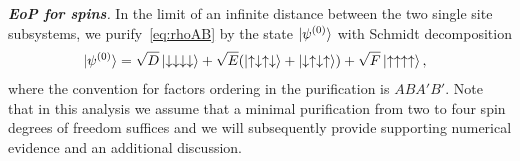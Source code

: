 \documentclass[prl,a4paper,notitlepage,twocolumn,superscriptaddress,longbibliography,reprint]{revtex4-2}
\newcommand{\mysection}[1]{{\vspace{10 pt}\noindent \emph{{\textbf{#1}}.}}}
\begin{document}
\mysection{EoP for spins} In the limit of an infinite distance between the two single site subsystems, we purify~\eqref{eq:rhoAB} by the state $\ket{\psi^{(0)}}$ with Schmidt decomposition
\begin{align}
\hspace{-7 pt}    \ket{\psi^{(0)}}=\sqrt{D}\ket{\downarrow\downarrow\downarrow\downarrow}+\sqrt{E}(\ket{\uparrow\downarrow\uparrow\downarrow}+\ket{\downarrow\uparrow\downarrow\uparrow})+\sqrt{F}\ket{\uparrow\uparrow\uparrow\uparrow},\label{eq:schmidt}
\end{align}
\normalsize
where the convention for factors ordering in the purification is $ABA'B'$. Note that in this analysis we assume that a minimal purification from two to four spin degrees of freedom suffices and we will subsequently provide supporting numerical evidence and an additional discussion.
\end{document}
